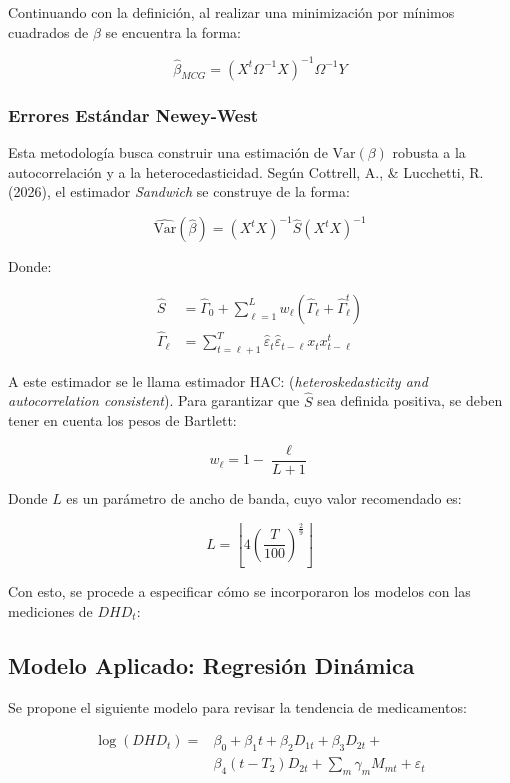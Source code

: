 \documentclass[10pt,twoside,xcolor=table,x11anmes]{IEEEtran}
\begin{document}
Continuando con la definición, al realizar una minimización por mínimos cuadrados de $\beta$ se encuentra la forma:

$$\hat{\beta}_{MCG}=\left(X^{t}\Omega^{-1}X\right)^{-1}\Omega^{-1}Y$$

\subsubsection{Errores Estándar 
Newey-West}

Esta metodología busca construir una estimación de $\text{Var}(\beta)$ robusta a la autocorrelación y a la heterocedasticidad. Según Cottrell, A., \& Lucchetti, R. (2026), el estimador \textit{Sandwich} se construye de la forma:

$$\widehat{\text{Var}}(\hat{\beta})= (X^{t}X)^{-1} \hat{S}(X^{t}X)^{-1}$$

Donde:

\begin{equation*}
    \begin{split}
         \hat{S}&=\hat{\Gamma}_0 +\sum_{\ell=1}^{L}w_{\ell}(\hat{\Gamma}_\ell + \hat{\Gamma}_{\ell}^t)\\
         \hat{\Gamma}_\ell&=\sum_{t=\ell+1}^{T}\hat{\varepsilon}_{t}\hat{\varepsilon}_{t-\ell}x_t x_{t-\ell}^{t}
    \end{split}
\end{equation*}

A este estimador se le llama estimador HAC: (\textit{heteroskedasticity and autocorrelation consistent}). Para garantizar que $\hat{S}$ sea definida positiva, se deben tener en cuenta los pesos de Bartlett:

$$w_\ell=1 - \frac{\ell}{L+1}$$

Donde $L$ es un parámetro de ancho de banda, cuyo valor recomendado es:

$$L=\left\lfloor 4\left(\frac{T}{100}\right)^{\frac{2}{9}}\right\rfloor $$

Con esto, se procede a especificar cómo se incorporaron los modelos con las mediciones de $DHD_t$:

\subsection{Modelo Aplicado: Regresión Dinámica}

Se propone el siguiente modelo para revisar la tendencia de medicamentos:

\begin{equation*}
    \begin{split}
        \log\left(DHD_t\right)  =& \beta_0 + \beta_1 t + \beta_2 D_{1t} + \beta_3 D_{2t} + \\
        &\beta_4 (t - T_2) D_{2t} + \sum_{m}\gamma_{m}M_{mt} + \varepsilon_t
    \end{split}
\end{equation*}
\end{document}
